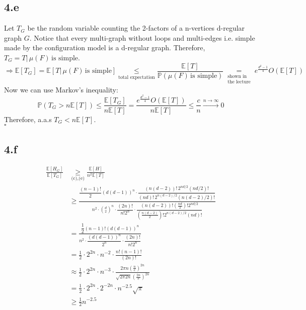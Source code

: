 \documentclass{article}
\begin{document}
\subsection*{4.e}
Let $T_G$ be the random variable counting the 2-factors of a n-vertices d-regular graph $G$. Notice that every multi-graph without loops and multi-edges i.e. simple made by the configuration model is a d-regular graph. Therefore, $T_G = T | \, \mu(F) \, \text{is simple}$.\\
\[
\Longrightarrow{} \mathbb{E}[T_G]=\mathbb{E}[T | \, \mu(F) \, \text{is simple}]\underset{\text{total expectation}}{\leq} \frac{\mathbb{E}[T]}{\mathbb{P}(\mu(F) \, \text{is simple})}\underset{\substack{\text{shown in } \\ \text{the lecture}}}{= }e^{\tfrac{d^2-1}{4}} O(\mathbb{E}[T])
\]
Now we can use Markov's inequality:\\
\[
\mathbb{P}(T_G>n\mathbb{E}[T])\leq\frac{\mathbb{E}[T_G]}{n\mathbb{E}[T]}=\frac{e^{\tfrac{d^2-1}{4}} O(\mathbb{E}[T])}{n\mathbb{E}[T]} \leq \frac{c}{n}\xrightarrow{n \to \infty}0
\]
Therefore, a.a.s $T_G<n\mathbb{E}[T]$.\\
\text{                                        }\hfill $\square$

\subsection*{4.f}
\begin{align*}
\frac{\mathbb{E}[H_G]}{\mathbb{E}[T_G]}
&\underset{\text{(c),(e)}}{\ge} 
\frac{\mathbb{E}[H]}{n^2 \mathbb{E}[T]} \\[2mm]
&\ge 
\frac{
\dfrac{(n-1)!}{2} (d(d-1))^n \cdot
\dfrac{(n(d-2))! \, 2^{nd/2} (nd/2)!}{(nd)! \, 2^{n(d-2)/2} (n(d-2)/2)!}
}{
n^2 \cdot \binom{d}{2}^n \cdot 
\dfrac{(2n)!}{n! 2^n} \cdot 
\dfrac{(n(d-2))! (\tfrac{nd}{2})! 2^{nd/2}}{(\tfrac{n(d-2)}{2})! 2^{n(d-2)/2} (nd)!}
} \\[2mm]
&=
\frac{
\dfrac{1}{2} (n-1)! (d(d-1))^n
}{
n^2 \cdot \dfrac{(d(d-1))^n}{2^n} \cdot \dfrac{(2n)!}{n! 2^n}
}\\[2mm]
&=\frac{1}{2}\cdot2^{2n}\cdot n^{-2}\cdot\frac{n!(n-1)!}{(2n)!
}\\[2mm]
&\approx\frac{1}{2}\cdot2^{2n}\cdot n^{-3}\cdot\frac{2\pi n(\frac{n}{e})^{2n}}{\sqrt{2\pi 2n}(\frac{2n}{e})^{2n}
}\\[2mm]
&=\frac{1}{2}\cdot2^{2n}\cdot2^{-2n}\cdot n^{-2.5}\sqrt{\pi
}\\[2mm]
&\ge\frac{1}{2} n^{-2.5}
\end{align*}
\end{document}
